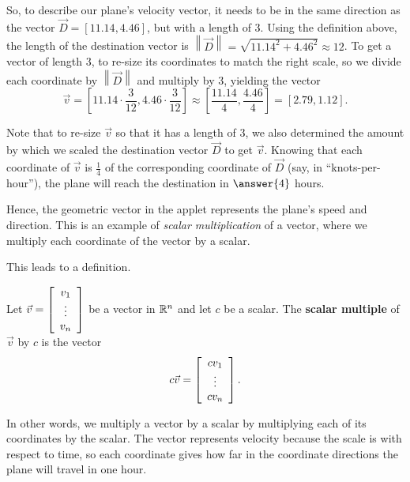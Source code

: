 \documentclass{ximera}
\begin{document}
\begin{example}
\begin{remark}
  \end{remark}

  So, to describe our plane's velocity vector, it needs to be in the same direction as the vector $\vec{D}=[11.14,4.46]$, but with a length of $3$. Using the definition above, the length of the destination vector is $\left\|\vec{D}\right\|=\sqrt{11.14^2+4.46^2}\approx 12$. To get a vector of length $3$, to re-size its coordinates to match the right scale, so we divide each coordinate by $\left\|\vec{D}\right\|$ and multiply by $3$, yielding the vector $$\vec{v}=\left[11.14\cdot \frac{3}{12},4.46\cdot \frac{3}{12}\right]\approx \left[\frac{11.14}{4},\frac{4.46}{4}\right] = [2.79,1.12].$$

  Note that to re-size $\vec{v}$ so that it has a length of $3$, we also determined the amount by which we scaled the destination vector $\vec{D}$ to get $\vec{v}$. Knowing that each coordinate of $\vec{v}$ is $\frac{1}{4}$ of the corresponding coordinate of $\vec{D}$ (say, in ``knots-per-hour''), the plane will reach the destination in $\answer{4}$ hours.

  Hence, the geometric vector in the applet represents the plane's speed and direction. This is an example of \emph{scalar multiplication} of a vector, where we multiply each coordinate of the vector by a scalar.

  \begin{remark}

    This leads to a definition.

    \begin{definition}

      Let $\vec{v} = \startmat{c} v_1 \\ \vdots \\ v_n \stopmat$ be a vector in $\R^n$ and let $c$ be a scalar. The \textbf{scalar multiple} of $\vec{v}$ by $c$ is the vector
      \begin{equation*}
        c\vec{v} = \startmat{c} cv_1 \\ \vdots \\ cv_n \stopmat.
      \end{equation*}

    \end{definition}

    In other words, we multiply a vector by a scalar by multiplying each of its coordinates by the scalar. The vector represents velocity because the scale is with respect to time, so each coordinate gives how far in the coordinate directions the plane will travel in one hour.

  \end{remark}


\end{example}
\end{document}
